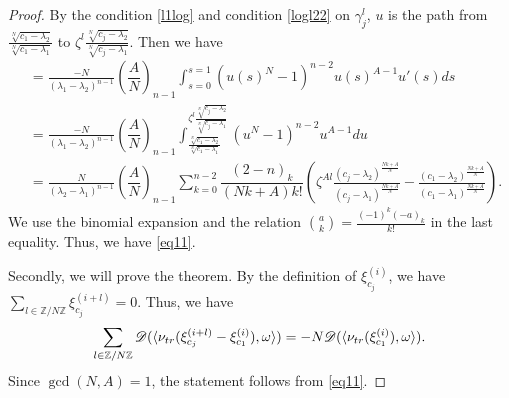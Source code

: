 \documentclass[10pt,a4paper]{amsart}
\newcommand{\Z}{\mathbb{Z}}
\renewcommand{\l}{\lambda}
\begin{document}
\begin{proof}
By the condition \ref{l1log} and condition \ref{logl22} on $\gamma_j^l$, $u$ is the path from $\frac{\sqrt[N]{c_1-\l_2}}{\sqrt[N]{c_1-\l_1}}$ to $\zeta^l\frac{\sqrt[N]{c_j-\l_2}}{\sqrt[N]{c_j-\l_1}}$.
Then we have
\begin{align*}
&=\frac{-N}{(\l_1-\l_2)^{n-1}} \left(\dfrac{A}N\right)_{n-1} \int_{s=0}^{s=1} (u(s)^N-1)^{n-2}u(s)^{A-1}u'(s)ds \\
&=\frac{-N}{(\l_1-\l_2)^{n-1}} \left(\dfrac{A}N\right)_{n-1}\int_{\frac{\sqrt[N]{c_1-\l_2}}{\sqrt[N]{c_1-\l_1}}}^{\zeta^l\frac{\sqrt[N]{c_j-\l_2}}{\sqrt[N]{c_j-\l_1}}} (u^N-1)^{n-2}u^{A-1}du \\
&= \frac{N}{(\l_2-\l_1)^{n-1}} \left(\dfrac{A}N\right)_{n-1}
 \sum_{k=0}^{n-2}  \dfrac{(2-n)_k}{(Nk+A)k!} 
  \left(\zeta^{Al} \frac{(c_j-\l_2)^{\frac{Nk+A}{N}}}{(c_j-\l_1)^{\frac{Nk+A}{N}}}- \frac{(c_1-\l_2)^{\frac{Nk+A}{N}}}{(c_1-\l_1)^{\frac{Nk+A}{N}}}\right). 
\end{align*}
We use the binomial expansion and the relation $\binom{a}{k}=\frac{(-1)^k(-a)_k}{k!}$ in the last equality.
Thus, we have \eqref{eq11}. 

Secondly, we will prove the theorem. 
By the definition of $\xi_{c_j}^{(i)}$, we have $\sum_{l\in \Z/N\Z}\xi_{c_j}^{(i+l)}=0$.
Thus, we have
\begin{equation*}
\sum_{l\in\Z/N\Z}\mathscr{D}(\langle \nu_{\rm tr}(\xi_{c_j}^{(i+l)} - \xi_{c_1}^{(i)}), \omega \rangle)=-N\mathscr{D}(\langle
\nu_{\rm tr}(\xi_{c_1}^{(i)}), \omega\rangle).
\end{equation*}
Since $\gcd(N, A)=1$, the statement follows from \eqref{eq11}.   
\end{proof}
\end{document}
